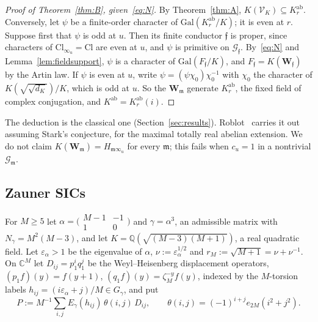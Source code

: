 \documentclass[11pt]{amsart}
\numberwithin{equation}{section}
\theoremstyle{plain}
\theoremstyle{definition}
\theoremstyle{remark}
\newcommand{\Kab}{K^{\mathrm{ab}}}
\begin{document}
\begin{proof}[Proof of Theorem~\ref{thm:B}, given~\eqref{eq:N}]
By Theorem~\ref{thm:A}, \(K(\mathcal V_K)\subseteq\Kab_r\). Conversely, let \(\psi\) be a finite-order character of \(\mathrm{Gal}(\Kab_r/K)\); it is even at \(r\). Suppose first that \(\psi\) is odd at \(u\). Then its finite conductor \(\mathfrak f\) is proper, since characters of \(\mathrm{Cl}_{\infty_u}=\mathrm{Cl}\) are even at \(u\), and \(\psi\) is primitive on \(\mathcal G_{\mathfrak f}\). By~\eqref{eq:N} and Lemma~\ref{lem:fieldsupport}, \(\psi\) is a character of \(\mathrm{Gal}(F_{\mathfrak f}/K)\), and \(F_{\mathfrak f}=K(\mathbf W_{\mathfrak f})\) by the Artin law. If \(\psi\) is even at \(u\), write \(\psi=(\psi\chi_0)\chi_0^{-1}\) with \(\chi_0\) the character of \(K(\sqrt{\sqrt{d_K}})/K\), which is odd at \(u\). So the \(\mathbf W_{\mathfrak m}\) generate \(\Kab_r\), the fixed field of complex conjugation, and \(\Kab=\Kab_r(i)\).
\end{proof}

The deduction is the classical one (Section~\ref{sec:results}). Roblot~\cite{Ro} carries it out assuming Stark's conjecture, for the maximal totally real abelian extension. We do not claim \(K(\mathbf W_{\mathfrak m})=H_{\mathfrak m\infty_u}\) for every \(\mathfrak m\); this fails when \(c_u=1\) in a nontrivial \(\mathcal G_{\mathfrak m}\).

\subsection{Zauner SICs}\label{sec:sic}

For \(M\ge5\) let \(\alpha=\bigl(\begin{smallmatrix}M-1&-1\\1&0\end{smallmatrix}\bigr)\) and \(\gamma=\alpha^3\), an admissible matrix with \(N_\gamma=M^2(M-3)\), and let \(K=\mathbb Q(\sqrt{(M-3)(M+1)})\), a real quadratic field. Let \(\varepsilon_\alpha>1\) be the eigenvalue of \(\alpha\), \(\nu:=\varepsilon_\alpha^{1/2}\) and \(r_M:=\sqrt{M+1}=\nu+\nu^{-1}\). On \(\mathbb C^M\) let \(D_{ij}=p_1^iq_1^j\) be the Weyl--Heisenberg displacement operators, \((p_1f)(y)=f(y+1)\), \((q_1f)(y)=\zeta_M^{-y}f(y)\), indexed by the \(M\)-torsion labels \(h_{ij}=(i\varepsilon_\alpha+j)/M\in G_\gamma\), and put
\[P:=M^{-1}\sum_{i,j}E_\gamma(h_{ij})\,\theta(i,j)\,D_{ij},\qquad \theta(i,j)=(-1)^{i+j}e_{2M}(i^2+j^2).\]
\end{document}
